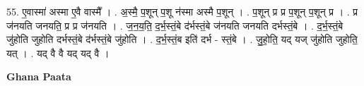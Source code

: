 \documentclass[17pt]{extarticle}
\begin{document}
55. ए॒वास्मा॑ अस्मा ए॒वै वास्मै᳚ । . अ॒स्मै॒ प॒शून् प॒शू न॑स्मा अस्मै प॒शून् । . प॒शून् प्र प्र प॒शून् प॒शून् प्र । . प्र ज॑नयति जनयति॒ प्र प्र ज॑नयति । . ज॒न॒य॒ति॒ द॒र्भ॒स्तं॒बे द॑र्भस्तं॒बे ज॑नयति जनयति दर्भस्तं॒बे । . द॒र्भ॒स्तं॒बे जु॑होति जुहोति दर्भस्तं॒बे द॑र्भस्तं॒बे जु॑होति । . द॒र्भ॒स्तं॒ब इति॑ दर्भ - स्तं॒बे । . जु॒हो॒ति॒ यद् यज् जु॑होति जुहोति॒ यत् । . यद् वै वै यद् यद् वै । \newline

\textbf{Ghana Paata } \newline
\end{document}
